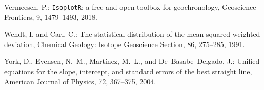 \documentclass{article}
\begin{document}
\begin{thebibliography}{10}
Vermeesch, P.: {\texttt{IsoplotR}: a free and open toolbox for geochronology},
  Geoscience Frontiers, 9, 1479--1493, 2018.

Wendt, I. and Carl, C.: The statistical distribution of the mean squared
  weighted deviation, Chemical Geology: Isotope Geoscience Section, 86,
  275--285, 1991.

York, D., Evensen, N.~M., Mart\'{i}nez, M.~L., and De~Basabe~Delgado, J.:
  {Unified equations for the slope, intercept, and standard errors of the best
  straight line}, American Journal of Physics, 72, 367--375, 2004.

\end{thebibliography}
\end{document}
